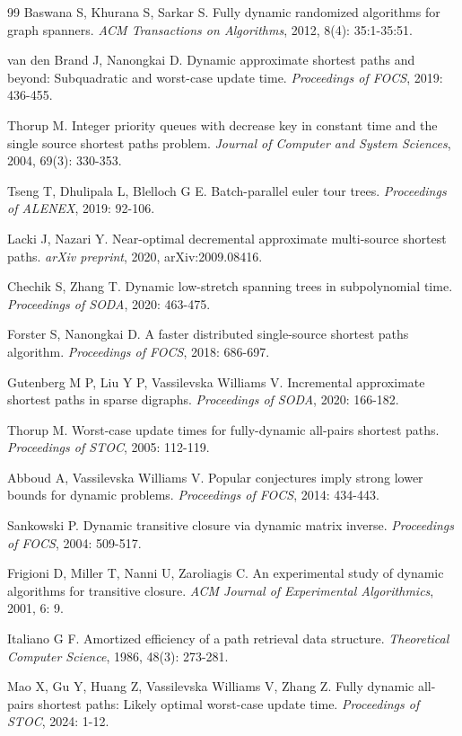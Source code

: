 \documentclass[12pt,a4paper]{ctexart}
\begin{document}
\begin{thebibliography}{99}
 Baswana S, Khurana S, Sarkar S. Fully dynamic randomized algorithms for graph spanners. \textit{ACM Transactions on Algorithms}, 2012, 8(4): 35:1-35:51.

 van den Brand J, Nanongkai D. Dynamic approximate shortest paths and beyond: Subquadratic and worst-case update time. \textit{Proceedings of FOCS}, 2019: 436-455.

 Thorup M. Integer priority queues with decrease key in constant time and the single source shortest paths problem. \textit{Journal of Computer and System Sciences}, 2004, 69(3): 330-353.

 Tseng T, Dhulipala L, Blelloch G E. Batch-parallel euler tour trees. \textit{Proceedings of ALENEX}, 2019: 92-106.

 Lacki J, Nazari Y. Near-optimal decremental approximate multi-source shortest paths. \textit{arXiv preprint}, 2020, arXiv:2009.08416.

 Chechik S, Zhang T. Dynamic low-stretch spanning trees in subpolynomial time. \textit{Proceedings of SODA}, 2020: 463-475.

 Forster S, Nanongkai D. A faster distributed single-source shortest paths algorithm. \textit{Proceedings of FOCS}, 2018: 686-697.

 Gutenberg M P, Liu Y P, Vassilevska Williams V. Incremental approximate shortest paths in sparse digraphs. \textit{Proceedings of SODA}, 2020: 166-182.

 Thorup M. Worst-case update times for fully-dynamic all-pairs shortest paths. \textit{Proceedings of STOC}, 2005: 112-119.

 Abboud A, Vassilevska Williams V. Popular conjectures imply strong lower bounds for dynamic problems. \textit{Proceedings of FOCS}, 2014: 434-443.

 Sankowski P. Dynamic transitive closure via dynamic matrix inverse. \textit{Proceedings of FOCS}, 2004: 509-517.

 Frigioni D, Miller T, Nanni U, Zaroliagis C. An experimental study of dynamic algorithms for transitive closure. \textit{ACM Journal of Experimental Algorithmics}, 2001, 6: 9.

 Italiano G F. Amortized efficiency of a path retrieval data structure. \textit{Theoretical Computer Science}, 1986, 48(3): 273-281.

 Mao X, Gu Y, Huang Z, Vassilevska Williams V, Zhang Z. Fully dynamic all-pairs shortest paths: Likely optimal worst-case update time. \textit{Proceedings of STOC}, 2024: 1-12.
\end{thebibliography}
\end{document}
